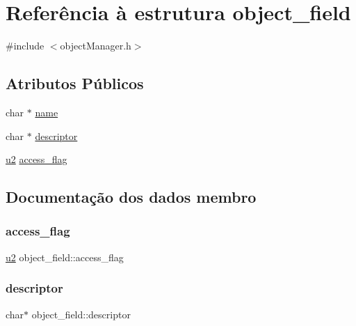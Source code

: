 \hypertarget{structobject__field}{}\section{Referência à estrutura object\+\_\+field}
\label{structobject__field}


{\ttfamily \#include $<$object\+Manager.\+h$>$}

\subsection*{Atributos Públicos}
\begin{DoxyCompactItemize}
\item 
char $\ast$ \hyperlink{structobject__field_ac75a676a209e55c6cd75433a64b3e2fd}{name}
\item 
char $\ast$ \hyperlink{structobject__field_aac77e9d3ac809a7245ac1a61424db5e6}{descriptor}
\item 
\hyperlink{util_8h_a55ef8d87fd202b8417704c089899c5b9}{u2} \hyperlink{structobject__field_a7c244a1048aba3caf0706f78a4dbd2b6}{access\+\_\+flag}
\end{DoxyCompactItemize}


\subsection{Documentação dos dados membro}
\mbox{\label{structobject__field_a7c244a1048aba3caf0706f78a4dbd2b6}} 
\subsubsection{\texorpdfstring{access\+\_\+flag}{access\_flag}}
{\footnotesize\ttfamily \hyperlink{util_8h_a55ef8d87fd202b8417704c089899c5b9}{u2} object\+\_\+field\+::access\+\_\+flag}

\mbox{\label{structobject__field_aac77e9d3ac809a7245ac1a61424db5e6}} 
\subsubsection{\texorpdfstring{descriptor}{descriptor}}
{\footnotesize\ttfamily char$\ast$ object\+\_\+field\+::descriptor}

